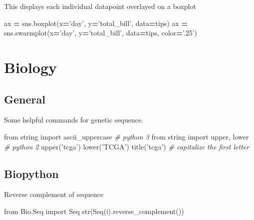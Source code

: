 \documentclass[]{book}
\newenvironment{Shaded}{\begin{snugshade}}{\end{snugshade}}
\newcommand{\StringTok}[1]{\textcolor[rgb]{0.31,0.60,0.02}{#1}}
\newcommand{\ImportTok}[1]{#1}
\newcommand{\CommentTok}[1]{\textcolor[rgb]{0.56,0.35,0.01}{\textit{#1}}}
\newcommand{\OperatorTok}[1]{\textcolor[rgb]{0.81,0.36,0.00}{\textbf{#1}}}
\newcommand{\BuiltInTok}[1]{#1}
\newcommand{\NormalTok}[1]{#1}
\begin{document}
This displays each individual datapoint overlayed on a boxplot

\begin{Shaded}
\begin{Highlighting}[]
\NormalTok{ax }\OperatorTok{=}\NormalTok{ sns.boxplot(x}\OperatorTok{=}\StringTok{'day'}\NormalTok{, y}\OperatorTok{=}\StringTok{'total_bill'}\NormalTok{, data}\OperatorTok{=}\NormalTok{tips)}
\NormalTok{ax }\OperatorTok{=}\NormalTok{ sns.swarmplot(x}\OperatorTok{=}\StringTok{'day'}\NormalTok{, y}\OperatorTok{=}\StringTok{'total_bill'}\NormalTok{, data}\OperatorTok{=}\NormalTok{tips, color}\OperatorTok{=}\StringTok{'.25'}\NormalTok{)}
\end{Highlighting}
\end{Shaded}

\chapter{Biology}\label{biology}

\section{General}\label{general}

Some helpful commands for genetic sequence.

\begin{Shaded}
\begin{Highlighting}[]
\ImportTok{from}\NormalTok{ string }\ImportTok{import}\NormalTok{ ascii_uppercase }\CommentTok{# python 3}
\ImportTok{from}\NormalTok{ string }\ImportTok{import}\NormalTok{ upper, lower }\CommentTok{# python 2}
\NormalTok{upper(}\StringTok{'tcga'}\NormalTok{)}
\NormalTok{lower(}\StringTok{'TCGA'}\NormalTok{)}
\NormalTok{title(}\StringTok{'tcga'}\NormalTok{) }\CommentTok{# capitalize the first letter}
\end{Highlighting}
\end{Shaded}

\section{Biopython}\label{biopython}

Reverse complement of sequence

\begin{Shaded}
\begin{Highlighting}[]
\ImportTok{from}\NormalTok{ Bio.Seq }\ImportTok{import}\NormalTok{ Seq}
\BuiltInTok{str}\NormalTok{(Seq(i).reverse_complement())}
\end{Highlighting}
\end{Shaded}
\end{document}
